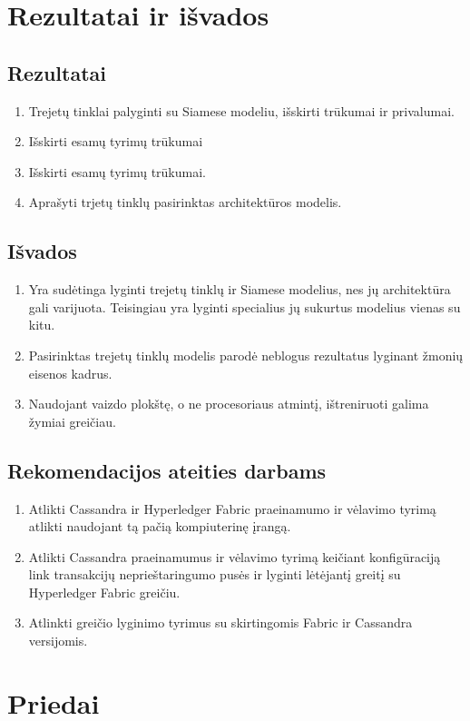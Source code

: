 \documentclass{VUMIFPSkursinis}
\begin{document}
\section{Rezultatai ir išvados}
\thispagestyle{empty} 
\subsection{Rezultatai}
\begin{enumerate}
\item{Trejetų tinklai palyginti su Siamese modeliu, išskirti trūkumai ir privalumai.}
\item{Išskirti esamų tyrimų trūkumai}
\item{Išskirti esamų tyrimų trūkumai.}
\item{Aprašyti trjetų tinklų pasirinktas architektūros modelis.}
\end{enumerate}
\subsection{Išvados}
\begin{enumerate}
\item{Yra sudėtinga lyginti trejetų tinklų ir Siamese modelius, nes jų architektūra gali varijuota. Teisingiau yra lyginti specialius jų sukurtus modelius vienas su kitu.}
\item{Pasirinktas trejetų tinklų modelis parodė neblogus rezultatus lyginant žmonių eisenos kadrus.}
\item{Naudojant vaizdo plokštę, o ne procesoriaus atmintį, ištreniruoti galima žymiai greičiau.}
\end{enumerate}
\subsection{Rekomendacijos ateities darbams}
\begin{enumerate}
\item{Atlikti Cassandra ir Hyperledger Fabric praeinamumo ir vėlavimo tyrimą atlikti naudojant tą pačią kompiuterinę įrangą.}
\item{Atlikti Cassandra praeinamumus ir vėlavimo tyrimą keičiant konfigūraciją link transakcijų neprieštaringumo pusės ir lyginti lėtėjantį greitį su Hyperledger Fabric greičiu.}
\item{Atlinkti greičio lyginimo tyrimus su skirtingomis Fabric ir Cassandra versijomis.}
\end{enumerate}
\pagebreak

\section{Priedai}
\thispagestyle{empty} 
\end{document}
